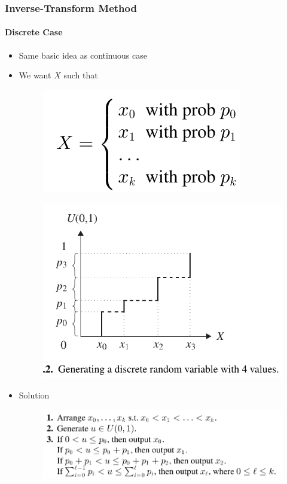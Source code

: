 \documentclass{beamer}
\begin{document}
\begin{frame}
    \frametitle{Inverse-Transform Method}
    \framesubtitle{Discrete Case}
	\begin{itemize}
		\item Same basic idea as continuous case
		\item We want $X$ such that
		{
		\begin{figure}
        \begin{center}
		\includegraphics[scale=0.2]{images/discre_inv_teans_1.jpeg}
        \end{center}
		\end{figure}
		} 
		    
		{
		\begin{figure}
        \begin{center}
		\includegraphics[scale=0.2]{images/discre_inv_teans_2.jpeg}
        \end{center}
		\end{figure}
		} 
		\item Solution 
		{
		\begin{figure}
        \begin{center}
		\includegraphics[scale=0.2]{images/discrete_rv_algo.jpg}
        \end{center}
		\end{figure}
		}
		  
	\end{itemize}	   
    
\end{frame}
\end{document}
